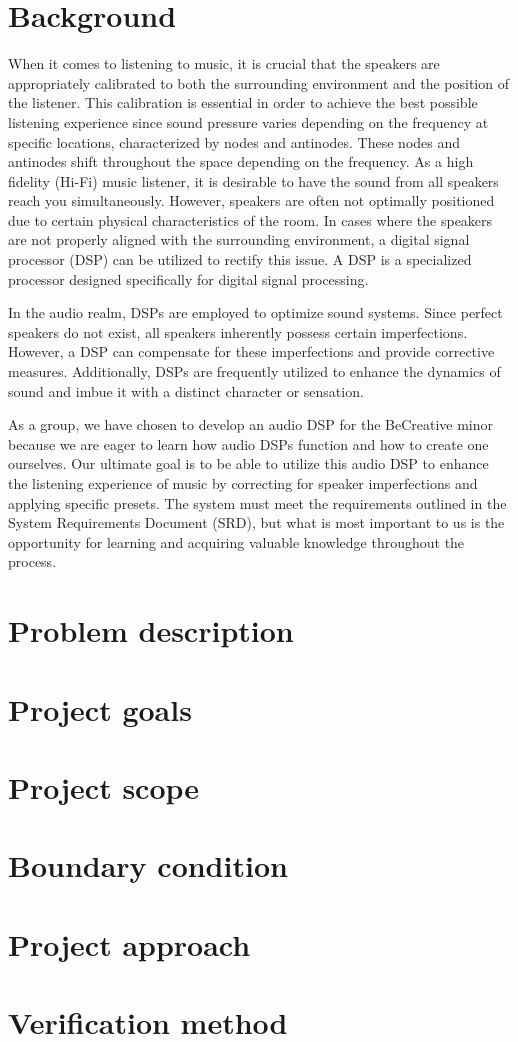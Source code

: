 \section{Background}
When it comes to listening to music, it is crucial that the speakers are appropriately calibrated to both the surrounding environment and the position of the listener. This calibration is essential in order to achieve the best possible listening experience since sound pressure varies depending on the frequency at specific locations, characterized by nodes and antinodes. These nodes and antinodes shift throughout the space depending on the frequency. As a high fidelity (Hi-Fi) music listener, it is desirable to have the sound from all speakers reach you simultaneously. However, speakers are often not optimally positioned due to certain physical characteristics of the room. In cases where the speakers are not properly aligned with the surrounding environment, a digital signal processor (DSP) can be utilized to rectify this issue. A DSP is a specialized processor designed specifically for digital signal processing.

\noindent In the audio realm, DSPs are employed to optimize sound systems. Since perfect speakers do not exist, all speakers inherently possess certain imperfections. However, a DSP can compensate for these imperfections and provide corrective measures. Additionally, DSPs are frequently utilized to enhance the dynamics of sound and imbue it with a distinct character or sensation.

\noindent As a group, we have chosen to develop an audio DSP for the BeCreative minor because we are eager to learn how audio DSPs function and how to create one ourselves. Our ultimate goal is to be able to utilize this audio DSP to enhance the listening experience of music by correcting for speaker imperfections and applying specific presets. The system must meet the requirements outlined in the System Requirements Document (SRD), but what is most important to us is the opportunity for learning and acquiring valuable knowledge throughout the process.


\section{Problem description}

\section{Project goals}

\section{Project scope}

\section{Boundary condition}

\section{Project approach}

\section{Verification method}

